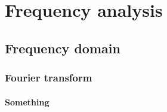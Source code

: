 \chapter{Frequency analysis}

\section{Frequency domain}

\subsection{Fourier transform}

\subsubsection{Something}
